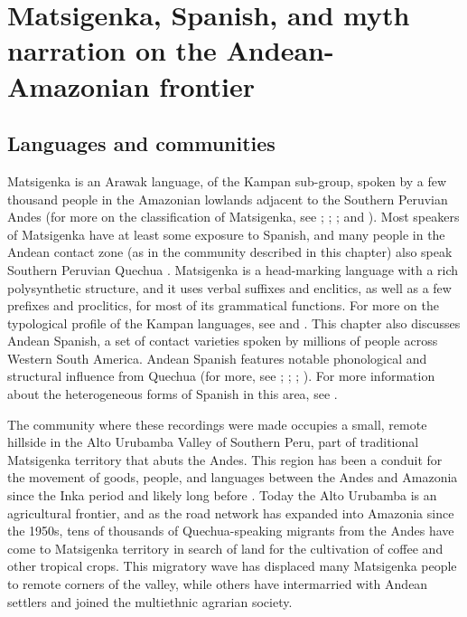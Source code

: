 \documentclass[output=paper]{LSP/langsci}
\begin{document}
\section{ Matsigenka, Spanish, and myth narration on the Andean-Amazonian frontier}
\label{Emmayth.narration}
\subsection{Languages and communities}
\label{Emland.comm}
Matsigenka is an Arawak language, of the Kampan sub-group, spoken by a few thousand people in the Amazonian lowlands adjacent to the Southern Peruvian Andes (for more on the classification of Matsigenka, see \citealt{aikhenvald1999}; \citealt[][212--219]{michael08}; \citealt{michael10}; and \citealt{payne81}). Most speakers of Matsigenka have at least some exposure to Spanish, and many people in the Andean contact zone (as in the community described in this chapter) also speak Southern Peruvian Quechua \citep{emlen.2017}. Matsigenka is a head-marking language with a rich polysynthetic structure, and it uses verbal suffixes and enclitics, as well as a few prefixes and proclitics, for most of its grammatical functions. For more on the typological profile of the Kampan languages, see \citet{michael08} and \citet{mihas15}. This chapter also discusses Andean Spanish, a set of contact varieties spoken by millions of people across Western South America. Andean Spanish features notable phonological and structural influence from Quechua (for more, see \citealt[][593--595]{adelaar2004}; \citealt{babel18}; \citealt{cerron03}; \citealt{escobar03}). For more information about the heterogeneous forms of Spanish in this area, see \citet{emlenforth}.
 
The community where these recordings were made occupies a small, remote hillside in the Alto Urubamba Valley of Southern Peru, part of traditional Matsigenka territory that abuts the Andes. This region has been a conduit for the movement of goods, people, and languages between the Andes and Amazonia since the Inka period and likely long before \citep{Gade1972,camino.1977}. Today the Alto Urubamba is an agricultural frontier, and as the road network has expanded into Amazonia since the 1950s, tens of thousands of Quechua-speaking migrants from the Andes have come to Matsigenka territory in search of land for the cultivation of coffee and other tropical crops. This migratory wave has displaced many Matsigenka people to remote corners of the valley, while others have intermarried with Andean settlers and joined the multiethnic agrarian society.
\end{document}
